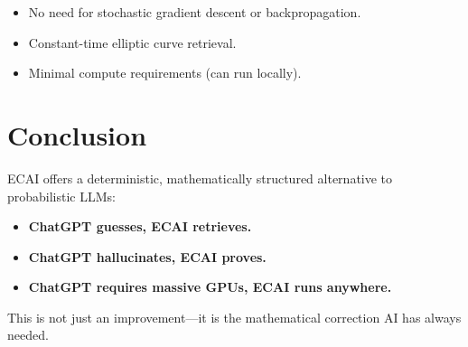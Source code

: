 \documentclass{article}
\begin{document}
\begin{itemize}
    \item No need for stochastic gradient descent or backpropagation.
    \item Constant-time elliptic curve retrieval.
    \item Minimal compute requirements (can run locally).
\end{itemize}

\section{Conclusion}
ECAI offers a deterministic, mathematically structured alternative to probabilistic LLMs:

\begin{itemize}
    \item \textbf{ChatGPT guesses, ECAI retrieves.}
    \item \textbf{ChatGPT hallucinates, ECAI proves.}
    \item \textbf{ChatGPT requires massive GPUs, ECAI runs anywhere.}
\end{itemize}

This is not just an improvement—it is the mathematical correction AI has always needed.
\end{document}
